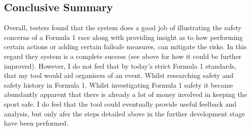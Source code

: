 \documentclass[12pt]{article} %
\begin{document}
\subsection{Conclusive Summary}
Overall, testers found that the system does a good job of illustrating the safety concerns of a Formula 1 race along with providing insight as to how performing certain actions or adding certain failsafe measures, can mitigate the risks. In this regard they system is a complete success (see above for how it could be further improved). However, I do not feel that by today's strict Formula 1 standards, that my tool would aid organisers of an event. Whilst researching safety and safety history in Formula 1. Whilst investigating Formula 1 safety it became abundantly apparent that there is already a lot of money involved in keeping the sport safe. I do feel that the tool could eventually provide useful feelback and analysis, but only afer the steps detailed above in the further development stage have been performed.
\newpage
\end{document}
